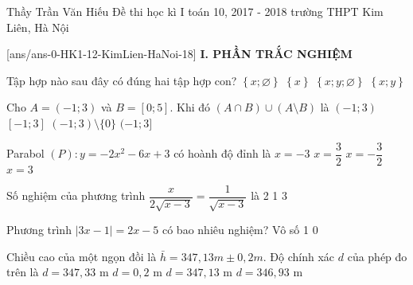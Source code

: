 	\begin{name}
		{Thầy Trần Văn Hiếu}
		{Đề thi học kì I toán 10, 2017 - 2018 trường THPT Kim Liên, Hà Nội}
	\end{name}
	\setcounter{ex}{0}\setcounter{bt}{0}
	[ans/ans-0-HK1-12-KimLien-HaNoi-18]
\noindent\textbf{I. PHẦN TRẮC NGHIỆM}
\begin{ex}%
Tập hợp nào sau đây có đúng hai tập hợp con?
\choice
{$\left\{ x;\varnothing\right\}$}
{\True $\left\{ x\right\} $}
{$\left\{ x;y;\varnothing \right\}$}
{$\left\{ x;y\right\}$}
\end{ex}
\begin{ex}%
Cho $A=(-1;3)$ và $B=[0;5]$. Khi đó $(A\cap B)\cup (A\setminus B)$ là
\choice
{\True $(-1;3)$}
{$[-1;3]$}
{$(-1;3)\setminus \{0\}$}
{$(-1;3]$}
\loigiai{Ta có $A\cap B=[0;3)$ và $A\setminus B=(-1;0)$.\\
Do đó: $(A\cap B)\cup (A\setminus B)=[0;3)\cup (-1;0)=(-1;3)$.
}
\end{ex}
\begin{ex}%
Parabol $(P):y=-2x^2-6x+3$ có hoành độ đỉnh là
\choice
{ $x=-3$}
{$x=\dfrac{3}{2}$}
{\True $x=-\dfrac{3}{2}$}
{$x=3$}
\end{ex}
\begin{ex}%
Số nghiệm của phương trình $\dfrac{x}{2\sqrt{x-3}}=\dfrac{1}{\sqrt{x-3}}$ là
\choice
{2}
{}
{1}
{3}
\end{ex}
\begin{ex}%
Phương trình $|3x-1|=2x-5$ có bao nhiêu nghiệm?
\choice
{Vô số}
{1}
{0}
{}
\end{ex}
\begin{ex}%
Chiều cao của một ngọn đồi là $\bar{h}=347,13m\pm0,2m$. Độ chính xác $d$ của phép đo trên là
\choice
{$d=347,33$ m}
{\True $d=0,2$ m}
{$d=347,13$ m}
{$d=346,93$ m}
\loigiai{
}
\end{ex}
